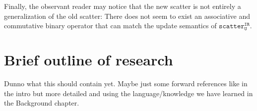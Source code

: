 Finally, the observant reader may notice that the new
scatter is not entirely a generalization of the old scatter:
There does not seem to exist an associative and commutative
binary operator that can match the update semantics of
$\mathtt{scatter^{IR}_{U}}$.


\section{Brief outline of research}

Dunno what this should contain yet. Maybe just some forward
references like in the intro but more detailed and using the
language/knowledge we have learned in the Background
chapter.
